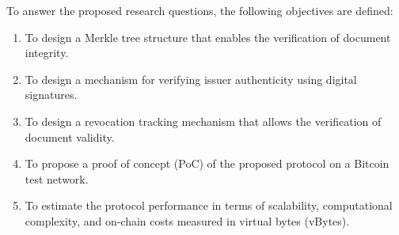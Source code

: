 To answer the proposed research questions, the following objectives are defined:
\begin{enumerate}[label=\alph*)]
    \item To design a Merkle tree structure that enables the verification of document integrity.
    \item To design a mechanism for verifying issuer authenticity using digital signatures.
    \item To design a revocation tracking mechanism that allows the verification of document validity.
    \item To propose a proof of concept (PoC) of the proposed protocol on a Bitcoin test network.
    \item To estimate the protocol performance in terms of scalability, computational complexity, and on-chain costs measured in virtual bytes (vBytes).
\end{enumerate}
